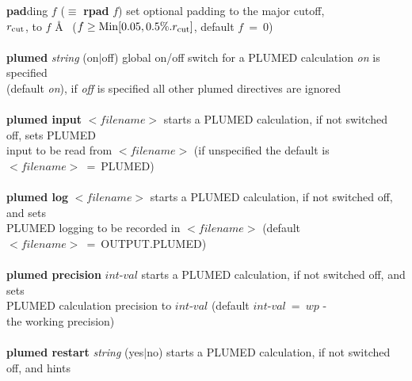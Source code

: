 \begin{tabbing}
\> {\bf pad}ding $f$  ($\equiv$ {\bf rpad} $f$) \> set optional padding to the major cutoff, \\
\>                                              \> $r_{\rm cut}$, to $f$ \AA~ ($f \ge {\rm Min}[0.05,0.5\%.r_{\rm cut}]$, default $f~=~0$) \\
\>                                              \> \\
\> {\bf plumed} {\em string} (on$|$off)         \> global on/off switch for a PLUMED calculation  {\em on} is specified \\
\>                                              \> (default {\em on}), if {\em off} is specified all other plumed directives are ignored \\
\>                                              \> \\
\> {\bf plumed input} $<$$filename$$>$          \> starts a PLUMED calculation, if not switched off, sets PLUMED \\
\>                                              \> input to be read from $<$$filename$$>$ (if unspecified the default is \\
\>                                              \> $<$$filename$$>$~=~PLUMED) \\
\>                                              \> \\
\> {\bf plumed log} $<$$filename$$>$            \> starts a PLUMED calculation, if not switched off, and sets \\
\>                                              \> PLUMED logging to be recorded in $<$$filename$$>$ (default \\
\>                                              \> $<$$filename$$>$~=~OUTPUT.PLUMED) \\
\>                                              \> \\
\> {\bf plumed precision} $int$-$val$           \> starts a PLUMED calculation, if not switched off, and sets \\
\>                                              \> PLUMED calculation precision to $int$-$val$ (default $int$-$val$~=~$wp$ - \\
\>                                              \> the \D working precision) \\
\>                                              \> \\
\> {\bf plumed restart} {\em string} (yes$|$no) \> starts a PLUMED calculation, if not switched off, and hints \\

\end{tabbing}

